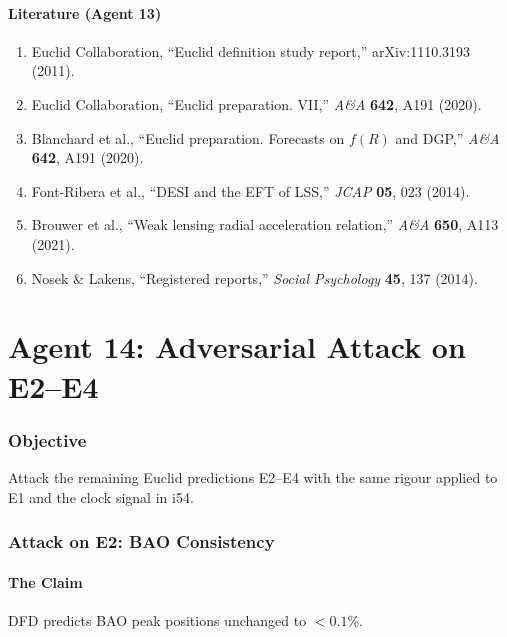 \documentclass[11pt,a4paper]{article}
\begin{document}
\subsection{Literature (Agent 13)}

\begin{enumerate}
\item Euclid Collaboration, ``Euclid definition study report,'' arXiv:1110.3193 (2011).
\item Euclid Collaboration, ``Euclid preparation. VII,'' \textit{A\&A} \textbf{642}, A191 (2020).
\item Blanchard et al., ``Euclid preparation. Forecasts on $f(R)$ and DGP,'' \textit{A\&A} \textbf{642}, A191 (2020).
\item Font-Ribera et al., ``DESI and the EFT of LSS,'' \textit{JCAP} \textbf{05}, 023 (2014).
\item Brouwer et al., ``Weak lensing radial acceleration relation,'' \textit{A\&A} \textbf{650}, A113 (2021).
\item Nosek \& Lakens, ``Registered reports,'' \textit{Social Psychology} \textbf{45}, 137 (2014).
\end{enumerate}


\part{Agent 14: Adversarial Attack on E2--E4}
\label{part:adversarial-e2e4}

\section{Objective}

Attack the remaining Euclid predictions E2--E4 with the same rigour applied to E1 and the clock signal in i54.

\section{Attack on E2: BAO Consistency}

\subsection{The Claim}

DFD predicts BAO peak positions unchanged to $< 0.1\%$.
\end{document}
